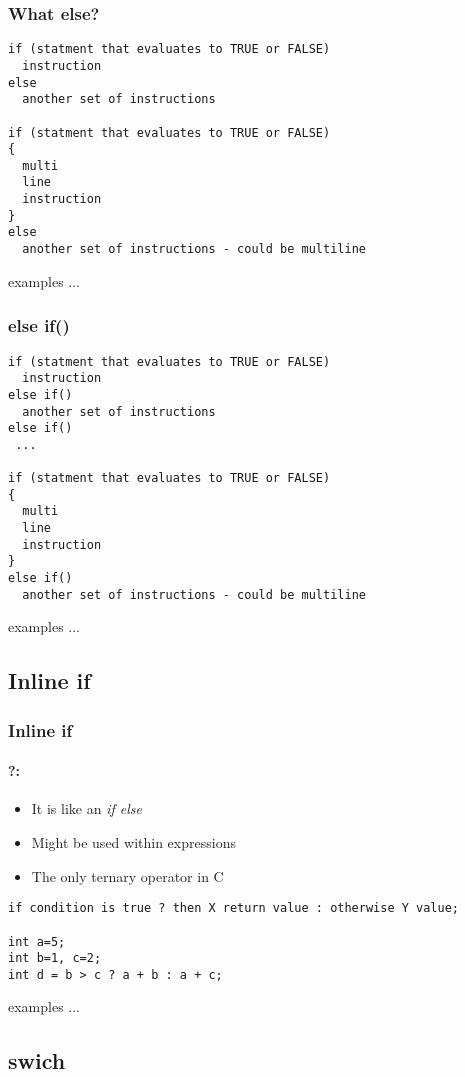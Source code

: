 \documentclass[10pt]{beamer}
\begin{document}
\begin{frame}[fragile]
  \frametitle{What else?}
  
  \begin{lstlisting}
if (statment that evaluates to TRUE or FALSE)
  instruction
else
  another set of instructions
  
if (statment that evaluates to TRUE or FALSE)
{
  multi
  line
  instruction
}
else
  another set of instructions - could be multiline
    \end{lstlisting}
    
    examples ...
\end{frame}

\begin{frame}[fragile]
  \frametitle{else if()}
  
  \begin{lstlisting}
if (statment that evaluates to TRUE or FALSE)
  instruction
else if()
  another set of instructions
else if()
 ...
  
if (statment that evaluates to TRUE or FALSE)
{
  multi
  line
  instruction
}
else if()
  another set of instructions - could be multiline
    \end{lstlisting}
    
    examples ...
\end{frame}

\subsection{Inline if}

\begin{frame}[fragile]
  \frametitle{Inline if}
  \framesubtitle{?:}
  \begin{itemize}
    \item It is like an \textit{if else}
    \item Might be used within expressions
    \item The only ternary operator in C
  \end{itemize}
  \begin{lstlisting}
if condition is true ? then X return value : otherwise Y value;

int a=5;
int b=1, c=2;
int d = b > c ? a + b : a + c;
    \end{lstlisting}
    
    examples ...
\end{frame}

\subsection{swich}
\end{document}
